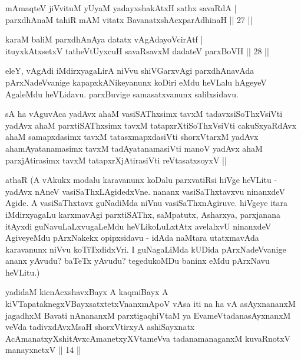 
\begin{shl}
mAmaqteV jiVvituM yUyaM yadayxshakAtxH sathx savaRdA | \\
parxdhAnaM tahiR mAM vitatx BavanatxshAcxparAdhinaH \hfill|| 27 || 
\end{shl}

\begin{shl}
karaM baliM parxdhAnAya datatx vAgAdayoV\s cirAtf | \\
ituyxkAtxsetxV tatheVtUyxcuH savaRsavxM dadateV parxBoVH \hfill|| 28 || 
\end{shl}

\begin{artha}
eleY, vAgAdi iMdirxyagaLirA niVvu shiVGarxvAgi parxdhAnavAda 
pArxNadeVvanige kapapxkANikeyanunx koDiri eMdu heVLalu hAgeyeV AgaleMdu 
heVLidavu. parxBuvige samasatxvanunx salilxsidavu.
\end{artha}



\begin{shl}
sA ha vAguvAca yadAvx ahaM vasiSAThxsimx tavxM tadavxsiSoThxV\s siVti yadAvx ahaM parxtiSAThxsimx tavxM tatapxrXtiSoThxV\s siVti cakuSxyaRdAvx ahaM samapxdasimx tavxM tatasxmapxdasiVti shorxVtarxM yadAvx ahamAyatanamasimx tavxM tadAyatanamasiVti manoV yadAvx ahaM parxjAtirasimx tavxM tatapxrXjAtirasiVti reVtasatxsoyxV  ||
\end{shl}

\begin{artha}
athaR (A vAkukx modalu karavanunx koDalu parxvatiRsi hiVge heVLitu - 
yadAvx nAneV vasiSaThxLAgidedxVne. nananx vasiSaThxtavxvu ninanxdeV 
Agide. A vasiSaThxtavx guNadiMda niVnu vasiSaThxnAgiruve. hiVgeye 
itara iMdirxyagaLu karxmavAgi parxtiSAThx, saMpatutx, Asharxya, 
parxjanana itAyxdi guNavuLaLxvugaLeMdu heVLikoLuLxtAtx avelalxvU 
ninanxdeV AgiveyeMdu pArxNakekx opipxsidavu - idAda naMtara utatxmavAda 
karavanunx niVvu koTiTxdidxVri. I guNagaLiMda kUDida pArxNadeVvanige 
ananx yAvudu? baTeTx yAvudu? tegedukoMDu baninx eMdu pArxNavu heVLitu.)
\end{artha}

\begin{shl}
yadidaM kicnAcxshavxBayx A kaqmiBayx A kiVTapataknegxVBayxsatxtetxV\s nanxmApoV vAsa iti na ha vA asAyxnananxM jagadhxM Bavati nAnananxM parxtigaqhiVtaM ya EvameVtadanasAyxnanxM veVda tadivxdAvxMsaH shorxVtirxyA ashiSayxnatx AcAmanatxyXshitAvxcAmanetxyXVtameVva tadanamanaganxM kuvaRnotxV manayxnetxV || 14 ||
\end{shl}

